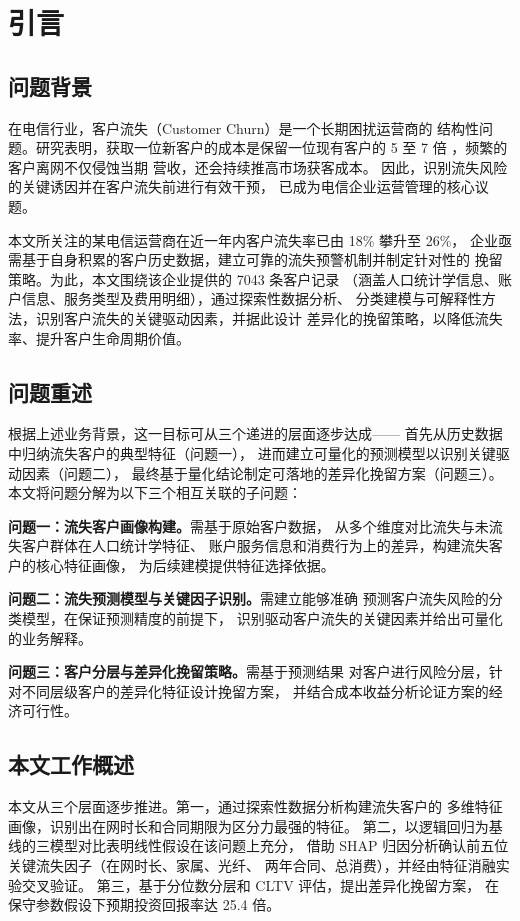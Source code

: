 \section{引言}

\subsection{问题背景}

在电信行业，客户流失（Customer Churn）是一个长期困扰运营商的
结构性问题。研究表明，获取一位新客户的成本是保留一位现有客户的
5 至 7 倍 \cite{reichheld1996zero}，频繁的客户离网不仅侵蚀当期
营收，还会持续推高市场获客成本。
因此，识别流失风险的关键诱因并在客户流失前进行有效干预，
已成为电信企业运营管理的核心议题。

本文所关注的某电信运营商在近一年内客户流失率已由 18\% 攀升至 26\%，
企业亟需基于自身积累的客户历史数据，建立可靠的流失预警机制并制定针对性的
挽留策略。为此，本文围绕该企业提供的 7043 条客户记录
（涵盖人口统计学信息、账户信息、服务类型及费用明细），通过探索性数据分析、
分类建模与可解释性方法，识别客户流失的关键驱动因素，并据此设计
差异化的挽留策略，以降低流失率、提升客户生命周期价值。

\subsection{问题重述}

根据上述业务背景，这一目标可从三个递进的层面逐步达成——
首先从历史数据中归纳流失客户的典型特征（问题一），
进而建立可量化的预测模型以识别关键驱动因素（问题二），
最终基于量化结论制定可落地的差异化挽留方案（问题三）。
本文将问题分解为以下三个相互关联的子问题：

\textbf{问题一：流失客户画像构建。}需基于原始客户数据，
从多个维度对比流失与未流失客户群体在人口统计学特征、
账户服务信息和消费行为上的差异，构建流失客户的核心特征画像，
为后续建模提供特征选择依据。

\textbf{问题二：流失预测模型与关键因子识别。}需建立能够准确
预测客户流失风险的分类模型，在保证预测精度的前提下，
识别驱动客户流失的关键因素并给出可量化的业务解释。

\textbf{问题三：客户分层与差异化挽留策略。}需基于预测结果
对客户进行风险分层，针对不同层级客户的差异化特征设计挽留方案，
并结合成本收益分析论证方案的经济可行性。

\subsection{本文工作概述}

本文从三个层面逐步推进。第一，通过探索性数据分析构建流失客户的
多维特征画像，识别出在网时长和合同期限为区分力最强的特征。
第二，以逻辑回归为基线的三模型对比表明线性假设在该问题上充分，
借助 SHAP 归因分析确认前五位关键流失因子（在网时长、家属、光纤、
两年合同、总消费），并经由特征消融实验交叉验证。
第三，基于分位数分层和 CLTV 评估，提出差异化挽留方案，
在保守参数假设下预期投资回报率达 25.4 倍。
